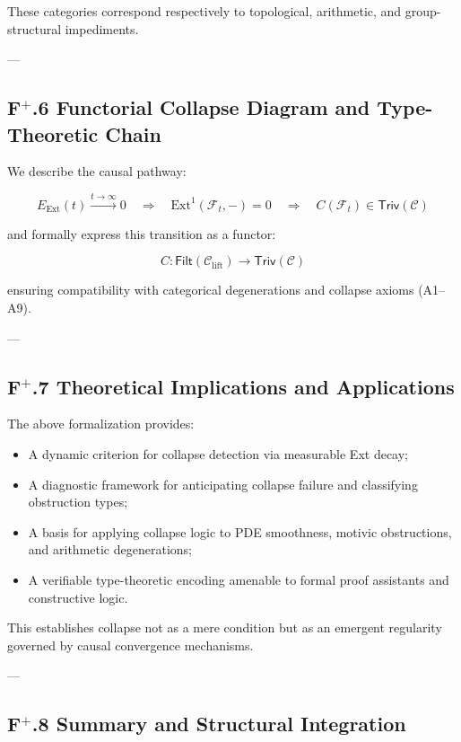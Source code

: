 \documentclass[11pt]{article}
\begin{document}
These categories correspond respectively to topological, arithmetic, and group-structural impediments.

---

\subsection*{F$^{+}$.6 Functorial Collapse Diagram and Type-Theoretic Chain}

We describe the causal pathway:

\[
E_{\mathrm{Ext}}(t) \xrightarrow{t \to \infty} 0 \quad \Rightarrow \quad \mathrm{Ext}^1(\mathcal{F}_t, -) = 0 \quad \Rightarrow \quad C(\mathcal{F}_t) \in \mathsf{Triv}(\mathcal{C})
\]

and formally express this transition as a functor:

\[
C : \mathsf{Filt}(\mathcal{C}_{\mathrm{lift}}) \longrightarrow \mathsf{Triv}(\mathcal{C})
\]

ensuring compatibility with categorical degenerations and collapse axioms (A1–A9).

---

\subsection*{F$^{+}$.7 Theoretical Implications and Applications}

The above formalization provides:

\begin{itemize}
    \item A dynamic criterion for collapse detection via measurable Ext decay;
    \item A diagnostic framework for anticipating collapse failure and classifying obstruction types;
    \item A basis for applying collapse logic to PDE smoothness, motivic obstructions, and arithmetic degenerations;
    \item A verifiable type-theoretic encoding amenable to formal proof assistants and constructive logic.
\end{itemize}

This establishes collapse not as a mere condition but as an emergent regularity governed by causal convergence mechanisms.

---

\subsection*{F$^{+}$.8 Summary and Structural Integration}
\end{document}
